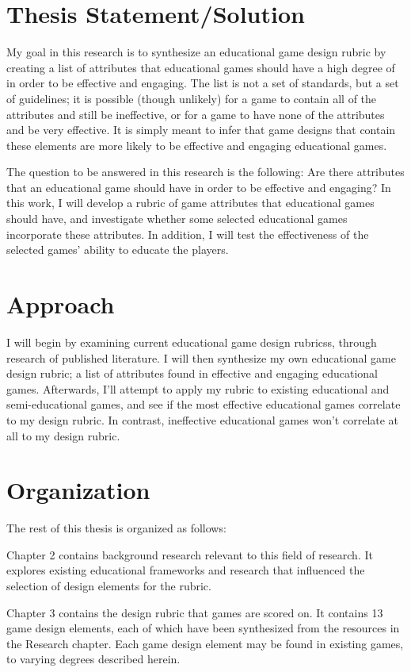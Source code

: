 \documentclass[12pt]{report}
\begin{document}
	\section{Thesis Statement/Solution}
		My goal in this research is to synthesize an educational game design rubric by creating a list of attributes that educational games should have a high degree of in order to be effective and engaging. The list is not a set of standards, but a set of guidelines; it is possible (though unlikely) for a game to contain all of the attributes and still be ineffective, or for a game to have none of the attributes and be very effective. It is simply meant to infer that game designs that contain these elements are more likely to be effective and engaging educational games.

		The question to be answered in this research is the following: Are there attributes that an educational game should have in order to be effective and engaging? In this work, I will develop a rubric of game attributes that educational games should have, and investigate whether some selected educational games incorporate these attributes. In addition, I will test the effectiveness of the selected games' ability to educate the players.

	\section{Approach} 
		I will begin by examining current educational game design rubricss, through research of published literature. I will then synthesize my own educational game design rubric; a list of attributes found in effective and engaging educational games. Afterwards, I'll attempt to apply my rubric to existing educational and semi-educational games, and see if the most effective educational games correlate to my design rubric. In contrast, ineffective educational games won't correlate at all to my design rubric.

	\section{Organization}
		The rest of this thesis is organized as follows:

		Chapter 2 contains background research relevant to this field of research. It explores existing educational frameworks and research that influenced the selection of design elements for the rubric.

		Chapter 3 contains the design rubric that games are scored on. It contains 13 game design elements, each of which have been synthesized from the resources in the Research chapter. Each game design element may be found in existing games, to varying degrees described herein.
\end{document}
